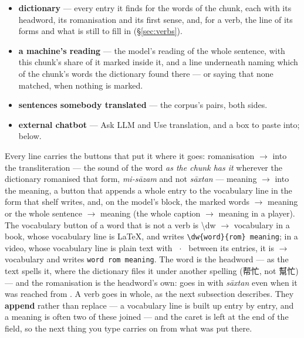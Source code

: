 \documentclass[11pt,oneside]{report}
\newcommand{\pw}[1]{\babelsublr{\mbox{\foreignlanguage{persian}{#1}}}}
\newcommand{\cw}[1]{\mbox{\foreignlanguage{chinese}{#1}}}
\newcommand{\menu}[1]{\textsf{#1}}
\begin{document}
\begin{itemize}
  \item \textbf{dictionary} --- every entry it finds for the words of the
    chunk, each with its headword, its romanisation and its first sense,
    and, for a verb, the line of its forms and what is still to fill in
    (\S\ref{sec:verbs}).
  \item \textbf{a machine's reading} --- the model's reading of the whole
    sentence, with this chunk's share of it marked inside it, and a line
    underneath naming which of the chunk's words the dictionary found there
    --- or saying that none matched, when nothing is marked.
  \item \textbf{sentences somebody translated} --- the corpus's pairs, both
    sides.
  \item \textbf{external chatbot} --- \menu{Ask LLM} and \menu{Use
    translation}, and a box to paste into; below.
\end{itemize}

\noindent Every line carries the buttons that put it where it goes:
\menu{romanisation $\rightarrow$} into the transliteration --- the sound of
the word \emph{as the chunk has it} wherever the dictionary romanised that
form, \emph{mi-s\=azam} and not \emph{s\=axtan} ---
\menu{meaning $\rightarrow$} into the meaning, a button that appends a whole
entry to the vocabulary line in the form that shelf writes, and, on the
model's block, \menu{the marked words $\rightarrow$ meaning} or
\menu{the whole sentence $\rightarrow$ meaning} (\menu{the whole caption
$\rightarrow$ meaning} in a player). The vocabulary button of a
word that is not a verb is \menu{\textbackslash dw $\rightarrow$ vocabulary}
in a book, whose vocabulary line is \LaTeX{}, and writes
\texttt{\textbackslash dw\{word\}\{rom\} meaning}; in a video, whose
vocabulary line is plain text with \texttt{ $\cdot$ } between its entries, it
is \menu{$\rightarrow$ vocabulary} and writes \texttt{word rom meaning}. The
word is the headword --- as the text spells it, where the dictionary files it
under another spelling (\cw{帮忙}, not \cw{幫忙}) --- and the romanisation is
the headword's own: \pw{ساختن} goes in with \emph{s\=axtan} even when it was
reached from \pw{می‌سازم}. A verb goes in whole, as the next subsection
describes. They \textbf{append} rather
than replace --- a vocabulary line is built up entry by entry, and a meaning is
often two of these joined --- and the caret is left at the end of the field, so
the next thing you type carries on from what was put there.
\end{document}
